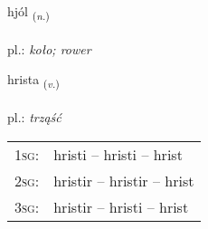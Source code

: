 \documentclass[frontgrid, backgrid]{flacards}\usepackage[]{graphicx}\usepackage[]{xcolor}
\begin{document}
\renewcommand{\flhead}{\vskip5pt \fboxsep=0pt {\small\bfseries\footnotesize Nafnorð | Noun}}
\renewcommand{\fcfoot}{\vskip5pt \fboxsep=0pt \hspace{2pt}{\small\bfseries\footnotesize 2K}}

\renewcommand{\blhead}{\vskip5pt {\small\bfseries\footnotesize Nafnorð | Noun }}
\renewcommand{\bcfoot}{\vskip5pt \hspace{2pt}{\small\bfseries\footnotesize 2K}}


{hjól \small{\textsubscript{(\textit{n.})}} \\[1ex] %
\textphonetic{[çouːl]} \\
pl.: \emph{koło; rower} \\  [2ex]
\renewcommand*{\arraystretch}{0.8}
}

\renewcommand{\flhead}{\vskip5pt \fboxsep=0pt {\small\bfseries\footnotesize Sagnorð | Verb}}
\renewcommand{\fcfoot}{\vskip5pt \fboxsep=0pt \hspace{2pt}{\small\bfseries\footnotesize 2K}}

\renewcommand{\blhead}{\vskip5pt {\small\bfseries\footnotesize Sagnorð | Verb }}
\renewcommand{\bcfoot}{\vskip5pt \hspace{2pt}{\small\bfseries\footnotesize 2K}}


{hrista \small{\textsubscript{(\textit{v.})}} \\[1ex] %
\textphonetic{[r̥ɪsta]} \\
pl.: \emph{trząść} \\  [2ex]
\renewcommand*{\arraystretch}{0.8}
\begin{tabular}{p{1cm}l}
\textsc{1sg}: & hristi -- hristi -- hrist \\ 
\textsc{2sg}: & hristir -- hristir -- hrist \\ 
\textsc{3sg}: & hristir -- hristi -- hrist \\ 
\end{tabular}
}
\end{document}
